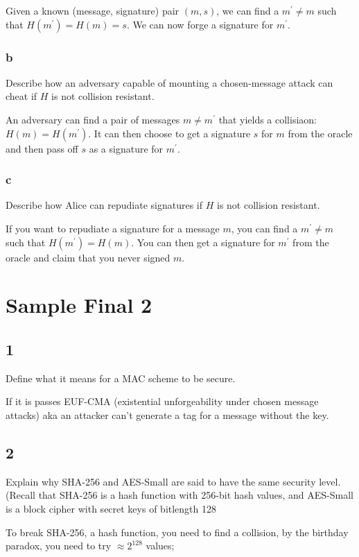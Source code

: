\documentclass[11pt]{article}
\begin{document}
Given a known (message, signature) pair $(m, s)$, we can find a $m^\prime \neq m$ such that $H(m^\prime) = H(m) = s$. We can now forge a signature for $m^\prime$.

\subsubsection{b} Describe how an adversary capable of mounting a chosen-message attack can cheat if $H$ is not collision resistant.

An adversary can find a pair of messages $m \neq m^\prime$ that yields a collisiaon: $H(m) = H(m^\prime)$. It can then choose to get a signature $s$ for $m$ from the oracle and then pass off $s$ as a signature for $m^\prime$.

\subsubsection{c} Describe how Alice can repudiate signatures if $H$ is not collision resistant.

If you want to repudiate a signature for a message $m$, you can find a $m^\prime \neq m$ such that $H(m^\prime) = H(m)$. You can then get a signature for $m^\prime$ from the oracle and claim that you never signed $m$.

\newpage

\section{Sample Final 2}

\subsection{1} Deﬁne what it means for a MAC scheme to be secure.

If it is passes EUF-CMA (existential unforgeability under chosen message attacks) aka an attacker can't generate a tag for a message without the key.

\subsection{2}  Explain why SHA-256 and AES-Small are said to have the same security level. (Recall that SHA-256 is a hash function with 256-bit hash values, and AES-Small is a block cipher with secret keys of bitlength 128

To break SHA-256, a hash function, you need to find a collision, by the birthday paradox, you need to try $\approx 2^{128}$ values;
\end{document}
